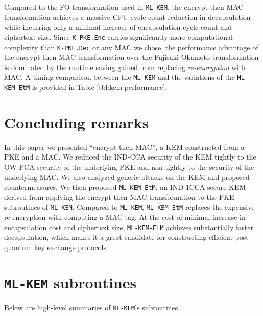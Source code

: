 \documentclass[runningheads]{llncs}
\newcommand{\encrypt}{\texttt{Enc}}
\newcommand{\decrypt}{\texttt{Dec}}
\begin{document}
Compared to the FO transformation used in \texttt{ML-KEM}, the encrypt-then-MAC transformation achieves a massive CPU cycle count reduction in decapsulation while incurring only a minimal increase of encapsulation cycle count and ciphertext size. Since \texttt{K-PKE.\encrypt} carries significantly more computational complexity than \texttt{K-PKE.\decrypt} or any MAC we chose, the performance advantage of the encrypt-then-MAC transformation over the Fujisaki-Okamoto transformation is dominated by the runtime saving gained from replacing \emph{re-encryption} with MAC. A timing comparison between the \texttt{ML-KEM} and the variations of the \texttt{ML-KEM-EtM} is provided in Table \ref{tbl:kem-performance}.


\section{Concluding remarks}\label{sec:conclusion}
In this paper we presented ``encrypt-then-MAC'', a KEM constructed from a PKE and a MAC. We reduced the IND-CCA security of the KEM tightly to the OW-PCA security of the underlying PKE and non-tightly to the security of the underlying MAC. We also analyzed generic attacks on the KEM and proposed countermeasures. We then proposed \texttt{ML-KEM-EtM}, an IND-1CCA secure KEM derived from applying the encrypt-then-MAC transformation to the PKE subroutines of \texttt{ML-KEM}. Compared to \texttt{ML-KEM}, \texttt{ML-KEM-EtM} replaces the expensive re-encryption with computing a MAC tag. At the cost of minimal increase in encapsulation cost and ciphertext size, \texttt{ML-KEM-EtM} achieves substantially faster decapsulation, which makes it a great candidate for constructing efficient post-quantum key exchange protocols.





\appendix
\section{\texttt{ML-KEM} subroutines}
Below are high-level summaries of \texttt{ML-KEM}'s subroutines.
\end{document}
